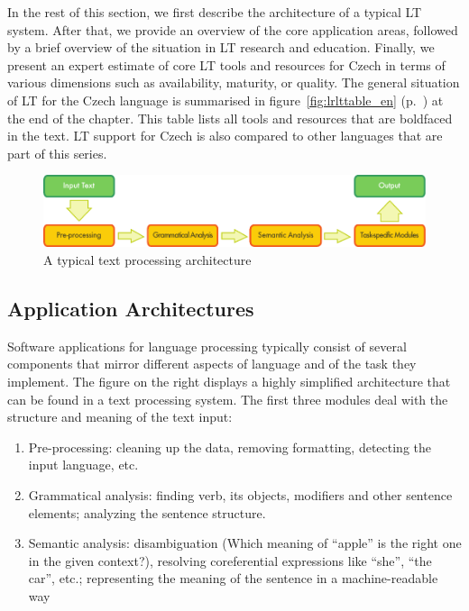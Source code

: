 \begin{multicols}{2}
In the rest of this section, we first describe the architecture of a typical LT system. After that, we provide an overview of the core application areas, followed by a brief overview of the situation in LT research and education. Finally, we present an expert estimate of core LT tools and resources for Czech in terms of various dimensions such as availability, maturity, or quality. The general situation of LT for the Czech language is summarised in figure~\ref{fig:lrlttable_en} (p.~\pageref{fig:lrlttable_en}) at the end of the chapter. This table lists all tools and resources that are boldfaced in the text. LT support for Czech is also compared to other languages that are part of this series.

\begin{figure}[b]
  \center
  \includegraphics[width=\textwidth]{../_media/english/text_processing_app_architecture}
  \caption{A typical text processing architecture}
  \label{fig:textprocessingarch_en}
\end{figure}

\subsection{Application Architectures}
Software applications for language processing typically consist of several components that mirror different aspects of language and of the task they implement. The figure on the right displays a highly simplified architecture that can be found in a text processing system. The first three modules deal with the structure and meaning of the text input:

\begin{enumerate}
\item Pre-processing: cleaning up the data, removing formatting, detecting the input language, etc.
\item Grammatical analysis: finding verb, its objects, modifiers and other sentence elements; analyzing the sentence structure.
\item Semantic analysis: disambiguation (Which meaning of “apple” is the right one in the given context?), resolving coreferential expressions like “she”, “the car”, etc.; representing the meaning of the sentence in a machine-readable way
\end{enumerate}


\end{multicols}
